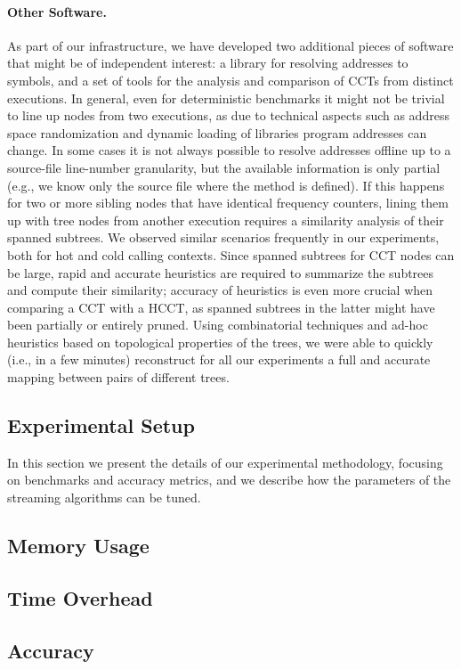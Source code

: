 \paragraph*{Other Software.} As part of our infrastructure, we have developed two additional pieces of software that might be of independent interest: a library for resolving addresses to symbols, and a set of tools for the analysis and comparison of CCTs from distinct executions. In general, even for deterministic benchmarks it might not be trivial to line up nodes from two executions, as due to technical aspects such as address space randomization and dynamic loading of libraries program addresses can change. In some cases it is not always possible to resolve addresses offline up to a source-file line-number granularity, but the available information is only partial (e.g., we know only the source file where the method is defined). If this happens for two or more sibling nodes that have identical frequency counters, lining them up with tree nodes from another execution requires a similarity analysis of their spanned subtrees. We observed similar scenarios frequently in our experiments, both for hot and cold calling contexts. Since spanned subtrees for CCT nodes can be large, rapid and accurate heuristics are required to summarize the subtrees and compute their similarity; accuracy of heuristics is even more crucial when comparing a CCT with a HCCT, as spanned subtrees in the latter might have been partially or entirely pruned. Using combinatorial techniques and ad-hoc heuristics based on topological properties of the trees, we were able to quickly (i.e., in a few minutes) reconstruct for all our experiments a full and accurate mapping between pairs of different trees.

\subsection{Experimental Setup}

In this section we present the details of our experimental methodology, focusing on benchmarks and accuracy metrics, and we describe how the parameters of the streaming algorithms can be tuned.

\subsection{Memory Usage}

\subsection{Time Overhead}

\subsection{Accuracy}